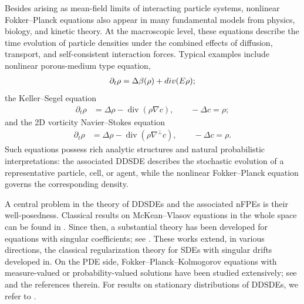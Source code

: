 \documentclass[10pt,a4paper]{amsart}
\numberwithin{equation}{section}
\def\div{\mathord{{\rm div}}}
\def\div{\mathord{{\rm div}}}
\begin{document}
Besides arising as mean-field limits of interacting particle systems,
nonlinear Fokker--Planck equations also appear in many fundamental models from
physics, biology, and kinetic theory. At the macroscopic level, these equations
describe the time evolution of  particle densities
under the combined effects of diffusion, transport, and self-consistent
interaction forces.  
Typical examples include  nonlinear   porous-medium type equation,
\begin{align*}
\partial_t\rho
=
\Delta\beta(\rho)+\div(E\rho);
\end{align*} 
the Keller--Segel equation
\begin{align*}
\partial_t\rho
&=
\Delta\rho
-
\operatorname{div}(\rho\nabla c),
\qquad
-\Delta c= \rho;
\end{align*}
and the 2D vorticity Navier--Stokes equation
\begin{align*}
\partial_t\rho
&=
\Delta\rho
-
\operatorname{div}(\rho\nabla^\perp c),
\qquad
-\Delta c= \rho.
\end{align*}
Such equations possess rich analytic structures and natural probabilistic
interpretations: the associated DDSDE describes the stochastic evolution of a
representative particle, cell, or agent, while the nonlinear Fokker--Planck
equation governs the corresponding   density.
 

A central problem in the theory of DDSDEs and the associated nFPEs is their well-posedness. Classical results on
McKean--Vlasov equations in the whole space can be found in
\cite{Fun84,Szn84,Sch87,Chi94}. Since then, a substantial theory has been
developed for equations with singular coefficients; see
\cite{RZ21,CRF22,HW23,Wan23,Zha25}. These works extend, in various directions, the classical regularization theory for SDEs with singular drifts developed in\cite{KR05}. 
On the PDE side, Fokker--Planck--Kolmogorov equations with
measure-valued or probability-valued solutions have been studied extensively;
see   \cite{ BR21,BR22,BR23,BSS23} and the references therein. For results on
stationary distributions of DDSDEs, we refer to
\cite{Wan18,LM22,HWY24}. 
 
\end{document}
